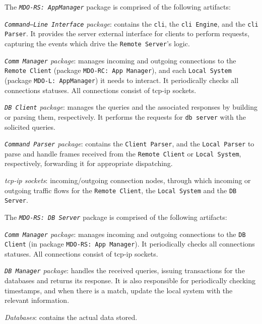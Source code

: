 The \emph{\texttt{MDO-RS: AppManager}} package is comprised of the following artifacts:
\begin{item-c}
\item
  \emph{\texttt{Command--Line Interface} package}: contains the
  \texttt{\gls{cli}}, the
  \texttt{\gls{cli} Engine}, and the \texttt{\gls{cli} Parser}. It provides the
  server external interface for clients to perform requests,
  capturing the events which drive the \texttt{Remote Server}'s logic.
\item
  \emph{\texttt{Comm Manager} package}: manages incoming and outgoing
  connections to the \texttt{Remote Client} (package \texttt{MDO-RC: App
    Manager}),  and each \texttt{Local System} (package \texttt{MDO-L:
    AppManager}) it needs to interact. It periodically checks all
  connections statuses. All connections
  consist of \gls{tcp-ip} sockets.
\item
  \emph{\texttt{DB Client} package}: manages the queries and the associated
  responses by building or parsing them, respectively. It performs the requests
  for \texttt{\gls{db} server} with the solicited queries.
\item 
  \emph{\texttt{Command Parser} package}: contains the \texttt{Client Parser},
  and the \texttt{Local Parser} to parse and handle frames received from the
  \texttt{Remote Client} or \texttt{Local System}, respectively, forwarding it
  for appropriate dispatching.
\item
  \emph{\gls{tcp-ip} sockets}: incoming/outgoing connection nodes, through which
  incoming or outgoing traffic flows for the \texttt{Remote Client}, the
  \texttt{Local System} and the \texttt{DB Server}.
\end{item-c}

\vspace{1em}
The \emph{\texttt{MDO-RS: DB Server}} package is comprised of the following artifacts:
\begin{item-c}
\item
  \emph{\texttt{Comm Manager} package}: manages incoming and outgoing
  connections to the \texttt{DB Client} (in package \texttt{MDO-RS: App
    Manager}). It periodically checks all
  connections statuses. All connections
  consist of \gls{tcp-ip} sockets.
\item
  \emph{\texttt{DB Manager} package}: handles the received queries, issuing
  transactions for the databases and returns its response. It is also
  responsible for periodically checking timestamps, and when there is a match,
  update the local system with the relevant information.
\item
  \emph{Databases}: contains the actual data stored.
\end{item-c}
%
